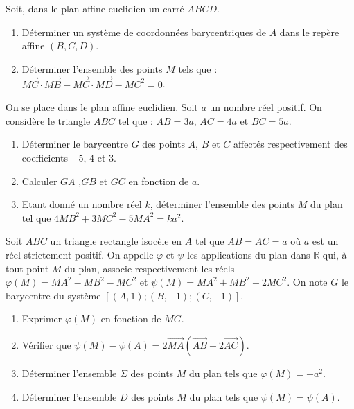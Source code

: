 %
\begin{exo}
      Soit, dans le plan affine euclidien un carr\'e $ABCD$.
      \begin{enumerate}
            \item D\'eterminer un syst\`eme de coordonn\'ees barycentriques de $A$ dans le rep\`ere affine $(B,C,D)$.
            \item D\'eterminer l'ensemble des points $M$ tels que : 
                  $\overrightarrow{MC} \cdot \overrightarrow{MB} + \overrightarrow{MC} \cdot \overrightarrow{MD} - MC^2 = 0$.
      \end{enumerate}
\end{exo}
%
\begin{exo}
      On se place dans le plan affine euclidien.
      Soit $a$ un nombre r\'eel positif.
      On consid\`ere le triangle $ABC$ tel que : $AB = 3a$, $AC = 4a$ et $BC = 5a$.
      \begin{enumerate}
            \item D\'eterminer le barycentre $G$ des points $A$, $B$ et $C$ 
                  affect\'es respectivement des coefficients $-5$, $4$ et $3$.
            \item Calculer $GA$ ,$GB$ et $GC$ en fonction de $a$.
            \item Etant donn\'e un nombre r\'eel $k$, d\'eterminer l'ensemble des points $M$ du plan tel que
                  $4 MB^2 + 3 MC^2 - 5 MA^2 = k a^2$.
      \end{enumerate}
\end{exo}
%
\begin{exo}
      Soit $ABC$ un triangle rectangle isoc\`ele en $A$ tel que 
      $AB = AC = a$ o\`u $a$ est un r\'eel strictement positif.
      On appelle $\varphi$ et $\psi$ les applications du plan dans $\mathbb{R}$ qui, 
      \`a tout point $M$ du plan, associe respectivement les r\'eels 
      $\varphi (M) = MA^2 - MB^2 - MC^2$ et $\psi (M) = MA^2 + MB^2 - 2 MC^2$.
      On note $G$ le barycentre du syst\`eme $[(A,1) ; (B,-1) ; (C,-1)]$.
      \begin{enumerate}
            \item Exprimer $\varphi (M)$ en fonction de $MG$.
            \item V\'erifier que $\psi (M) - \psi (A) = 2 \overrightarrow{MA} (\overrightarrow{AB} - 2 \overrightarrow{AC})$.
            \item D\'eterminer l'ensemble $\Sigma$ des points $M$ du plan tels que $\varphi (M) = -a^2$.
            \item D\'eterminer l'ensemble $D$ des points $M$ du plan tels que $\psi (M) = \psi (A)$.
      \end{enumerate}
\end{exo}
